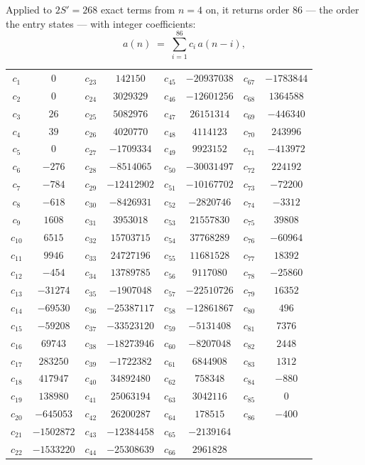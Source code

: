 \documentclass[11pt,a4paper]{article}
\theoremstyle{plain}
\theoremstyle{definition}
\begin{document}
Applied to $2S'=268$ exact terms from $n=4$ on, it returns order $86$ --- the
order the entry states --- with integer coefficients:
\[
a(n)\;=\;\sum_{i=1}^{86}c_i\,a(n-i),
\]
\begin{center}\small
\begin{tabular}{cccccccc}
$c_{1}$ & $0$ & $c_{23}$ & $142150$ & $c_{45}$ & $-20937038$ & $c_{67}$ & $-1783844$ \\
$c_{2}$ & $0$ & $c_{24}$ & $3029329$ & $c_{46}$ & $-12601256$ & $c_{68}$ & $1364588$ \\
$c_{3}$ & $26$ & $c_{25}$ & $5082976$ & $c_{47}$ & $26151314$ & $c_{69}$ & $-446340$ \\
$c_{4}$ & $39$ & $c_{26}$ & $4020770$ & $c_{48}$ & $4114123$ & $c_{70}$ & $243996$ \\
$c_{5}$ & $0$ & $c_{27}$ & $-1709334$ & $c_{49}$ & $9923152$ & $c_{71}$ & $-413972$ \\
$c_{6}$ & $-276$ & $c_{28}$ & $-8514065$ & $c_{50}$ & $-30031497$ & $c_{72}$ & $224192$ \\
$c_{7}$ & $-784$ & $c_{29}$ & $-12412902$ & $c_{51}$ & $-10167702$ & $c_{73}$ & $-72200$ \\
$c_{8}$ & $-618$ & $c_{30}$ & $-8426931$ & $c_{52}$ & $-2820746$ & $c_{74}$ & $-3312$ \\
$c_{9}$ & $1608$ & $c_{31}$ & $3953018$ & $c_{53}$ & $21557830$ & $c_{75}$ & $39808$ \\
$c_{10}$ & $6515$ & $c_{32}$ & $15703715$ & $c_{54}$ & $37768289$ & $c_{76}$ & $-60964$ \\
$c_{11}$ & $9946$ & $c_{33}$ & $24727196$ & $c_{55}$ & $11681528$ & $c_{77}$ & $18392$ \\
$c_{12}$ & $-454$ & $c_{34}$ & $13789785$ & $c_{56}$ & $9117080$ & $c_{78}$ & $-25860$ \\
$c_{13}$ & $-31274$ & $c_{35}$ & $-1907048$ & $c_{57}$ & $-22510726$ & $c_{79}$ & $16352$ \\
$c_{14}$ & $-69530$ & $c_{36}$ & $-25387117$ & $c_{58}$ & $-12861867$ & $c_{80}$ & $496$ \\
$c_{15}$ & $-59208$ & $c_{37}$ & $-33523120$ & $c_{59}$ & $-5131408$ & $c_{81}$ & $7376$ \\
$c_{16}$ & $69743$ & $c_{38}$ & $-18273946$ & $c_{60}$ & $-8207048$ & $c_{82}$ & $2448$ \\
$c_{17}$ & $283250$ & $c_{39}$ & $-1722382$ & $c_{61}$ & $6844908$ & $c_{83}$ & $1312$ \\
$c_{18}$ & $417947$ & $c_{40}$ & $34892480$ & $c_{62}$ & $758348$ & $c_{84}$ & $-880$ \\
$c_{19}$ & $138980$ & $c_{41}$ & $25063194$ & $c_{63}$ & $3042116$ & $c_{85}$ & $0$ \\
$c_{20}$ & $-645053$ & $c_{42}$ & $26200287$ & $c_{64}$ & $178515$ & $c_{86}$ & $-400$ \\
$c_{21}$ & $-1502872$ & $c_{43}$ & $-12384458$ & $c_{65}$ & $-2139164$ &  &  \\
$c_{22}$ & $-1533220$ & $c_{44}$ & $-25308639$ & $c_{66}$ & $2961828$ &  &  \\
\end{tabular}
\end{center}
\end{document}
